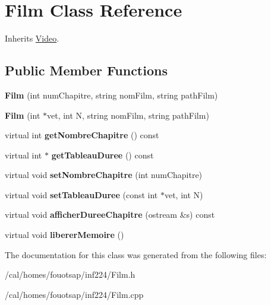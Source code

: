 \hypertarget{class_film}{\section{Film Class Reference}
\label{class_film}
}


Inherits \hyperlink{class_video}{Video}.

\subsection*{Public Member Functions}
\begin{DoxyCompactItemize}
\item 
\hypertarget{class_film_add96a21aaa3ae32a9bb860ddafeb48ff}{{\bfseries Film} (int num\+Chapitre, string nom\+Film, string path\+Film)}\label{class_film_add96a21aaa3ae32a9bb860ddafeb48ff}

\item 
\hypertarget{class_film_aee1f05dbc38270e72186bedfc55c7d74}{{\bfseries Film} (int $\ast$vet, int N, string nom\+Film, string path\+Film)}\label{class_film_aee1f05dbc38270e72186bedfc55c7d74}

\item 
\hypertarget{class_film_acc6f65afe85fdc48ff52072149664d22}{virtual int {\bfseries get\+Nombre\+Chapitre} () const }\label{class_film_acc6f65afe85fdc48ff52072149664d22}

\item 
\hypertarget{class_film_aeb014e6e9401a70e7787053a6e8bc6a1}{virtual int $\ast$ {\bfseries get\+Tableau\+Duree} () const }\label{class_film_aeb014e6e9401a70e7787053a6e8bc6a1}

\item 
\hypertarget{class_film_ac610b7fc13d8903e6c06af1864f2bcea}{virtual void {\bfseries set\+Nombre\+Chapitre} (int num\+Chapitre)}\label{class_film_ac610b7fc13d8903e6c06af1864f2bcea}

\item 
\hypertarget{class_film_a07054ea86fee34dbc716269dee9803cf}{virtual void {\bfseries set\+Tableau\+Duree} (const int $\ast$vet, int N)}\label{class_film_a07054ea86fee34dbc716269dee9803cf}

\item 
\hypertarget{class_film_a250b49e275035c8bcaec3cf1d0627b4e}{virtual void {\bfseries afficher\+Duree\+Chapitre} (ostream \&s) const }\label{class_film_a250b49e275035c8bcaec3cf1d0627b4e}

\item 
\hypertarget{class_film_aab7e0aacfdf61b43e3fecda2aad8d7c7}{virtual void {\bfseries liberer\+Memoire} ()}\label{class_film_aab7e0aacfdf61b43e3fecda2aad8d7c7}

\end{DoxyCompactItemize}


The documentation for this class was generated from the following files\+:\begin{DoxyCompactItemize}
\item 
/cal/homes/fouotsap/inf224/Film.\+h\item 
/cal/homes/fouotsap/inf224/Film.\+cpp\end{DoxyCompactItemize}
